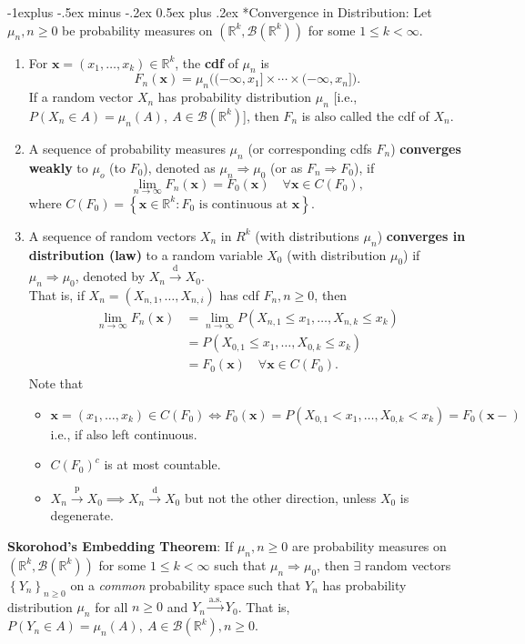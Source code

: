 \documentclass[paper=letter,fontsize=3mm]{scrartcl}
\makeatletter
\newcommand{\convdist}{\stackrel{\text{d}}{\longrightarrow}}
\newcommand{\convprob}{\stackrel{\text{p}}{\longrightarrow}}
\newcommand{\convas}{\stackrel{\text{a.s.}}{\longrightarrow}}
\newcommand{\Borel}{\mathcal{B}}
\newcommand{\R}{\mathbb{R}}
\newcommand\set[1]{\left\{ #1 \right\}}
\renewcommand{\subsection}{\@startsection{subsection}{2}{0mm}%
                                {-1explus -.5ex minus -.2ex}%
                                {0.5ex plus .2ex}%
                                {\normalfont\normalsize\bfseries}}
\makeatother
\begin{document}
\begin{multicols*}{3}
\subsection*{Convergence in Distribution}: Let $\mu_n, n\ge0$ be probability measures on $(\R^k, \Borel(\R^k))$ for some $1 \le k < \infty$.
\begin{enumerate}
\item For $\mathbf{x} = (x_1, \dots, x_k) \in \R^k$, the \textbf{cdf} of $\mu_n$ is
$$F_n(\mathbf{x}) = \mu_n\big( (-\infty, x_1] \times \cdots \times (-\infty, x_n]\big).$$
If a random vector $X_n$ has probability distribution $\mu_n$ [i.e., $P(X_n \in A) = \mu_n(A), ~A \in \Borel(\R^k)$], then $F_n$ is also called the cdf of $X_n$. 
\item A sequence of probability measures $\mu_n$ (or corresponding cdfs $F_n$) \textbf{converges weakly} to $\mu_o$ (to $F_0$), denoted as $\mu_n \Rightarrow \mu_0$ (or as $F_n \Rightarrow F_0$), if
$$\lim_{n\to\infty}F_n(\mathbf{x}) = F_0(\mathbf{x}) \quad \forall \mathbf{x} \in C(F_0),$$
where $C(F_0) = \set{\mathbf{x} \in \R^k: F_0 \text{ is continuous at } \mathbf{x}}$. 
\item A sequence of random vectors $X_n$ in $R^k$ (with distributions $\mu_n$) \textbf{converges in distribution (law)} to a random variable $X_0$ (with distribution $\mu_0$) if $\mu_n \Rightarrow \mu_0$, denoted by $X_n \convdist X_0$. \\
That is, if $X_n = (X_{n,1}, \dots, X_{n,i})$ has cdf $F_n, n \ge 0$, then
\begin{align*}
\lim_{n\to\infty}F_n(\mathbf{x}) 
&= \lim_{n\to\infty} P(X_{n,1} \le x_1, \dots, X_{n,k} \le x_k) \\
&= P(X_{0,1} \le x_1, \dots, X_{0,k} \le x_k) \\
&= F_0(\mathbf{x}) \quad \forall \mathbf{x} \in C(F_0).
\end{align*}
Note that
\begin{itemize}
\item $\mathbf{x} = (x_1, \dots, x_k) \in C(F_0) \iff F_0(\mathbf{x}) = P(X_{0,1} < x_1, \dots, X_{0,k} < x_k) = F_0(\mathbf{x}-)$
i.e., if also left continuous. 
\item $C(F_0)^c$ is at most countable.
\item $X_n \convprob X_0 \implies X_n \convdist X_0$ but not the other direction, unless $X_0$ is degenerate.
\end{itemize}
\end{enumerate}

\textbf{Skorohod's Embedding Theorem}: If $\mu_n, n\ge0$ are probability measures on $(\R^k, \Borel(\R^k))$ for some $1\le k < \infty$ such that $\mu_n \Rightarrow \mu_0$, then $\exists$ random vectors $\set{Y_n}_{n\ge0}$ on a \emph{common} probability space such that $Y_n$ has probability distribution $\mu_n$ for all $n \ge 0$ and $Y_n \convas Y_0$. That is, $P(Y_n \in A) = \mu_n(A), ~A \in \Borel(\R^k), n \ge 0$. \\ \medskip


\end{multicols*}
\end{document}
